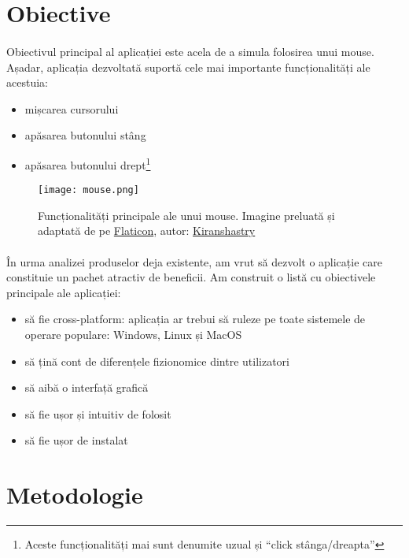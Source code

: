 \clearpage

\section*{Obiective}
\paragraph{}
Obiectivul principal al aplicației este acela de a simula folosirea unui mouse.
Așadar, aplicația dezvoltată suportă cele mai importante funcționalități ale acestuia:
\begin{itemize}
    \item mișcarea cursorului
    \item apăsarea butonului stâng
    \item apăsarea butonului drept\footnote{Aceste funcționalități mai sunt denumite uzual și ``click stânga/dreapta''}
\end{itemize}

\begin{figure}[h]
    \centering
    \texttt{[image: mouse.png]}
    \caption{Funcționalități principale ale unui mouse. Imagine preluată și adaptată de pe \href{https://www.flaticon.com}{Flaticon}, autor: \href{https://www.flaticon.com/authors/kiranshastry}{Kiranshastry}}
\end{figure}

\paragraph{}
În urma analizei produselor deja existente, am vrut să dezvolt o aplicație care constituie un pachet atractiv de beneficii.
Am construit o listă cu obiectivele principale ale aplicației:
\begin{itemize}
    \item să fie cross-platform: aplicația ar trebui să ruleze pe toate sistemele de operare populare: Windows, Linux și MacOS
    \item să țină cont de diferențele fizionomice dintre utilizatori
    \item să aibă o interfață grafică
    \item să fie ușor și intuitiv de folosit
    \item să fie ușor de instalat
\end{itemize}

\section*{Metodologie}

